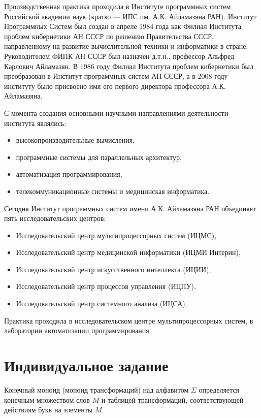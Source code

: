 \documentclass[14pt, russian]{scrartcl}
\begin{document}
\bigskip

Производственная практика проходила в Институте программных систем
Российской академии наук (кратко --- ИПС им. А.К. Айламазяна РАН). Институт Программных Систем был создан в апреле 1984 года как Филиал Института проблем кибернетики АН СССР по решению Правительства СССР, направленному на развитие вычислительной техники и информатики в стране. Руководителем ФИПК АН СССР был назначен д.т.н., профессор Альфред Карлович Айламазян. В 1986 году Филиал Института проблем кибернетики был преобразован в Институт программных систем АН СССР, а в 2008 году институту было присвоено имя его первого директора профессора А.К. Айламазяна.

С момента создания основными научными направлениями
деятельности института являлись:
\begin{itemize}
\item высокопроизводительные вычисления,
\item программные системы для параллельных архитектур,
\item автоматизация программирования,
\item телекоммуникационные системы и медицинская информатика.
\end{itemize}

Сегодня Институт программных систем имени А.К. Айламазяна РАН объединяет пять исследовательских центров:
\begin{itemize}
\item Исследовательский центр мультипроцессорных систем (ИЦМС),
\item Исследовательский центр медицинской информатики (ИЦМИ Интерин),
\item Исследовательский центр искусственного интеллекта (ИЦИИ),
\item Исследовательский центр процессов управления (ИЦПУ),
\item Исследовательский центр системного анализа (ИЦСА).
\end{itemize}

Практика проходила в исследовательском центре мультипроцессорных систем, в лаборатории автоматизации программирования.

\newpage
\section{Индивидуальное задание}

Конечный моноид (моноид трансформаций) над алфавитом $\Sigma$ определяется
конечным множеством слов $M$ и таблицей трансформаций, соответствующей действиям
букв на элементы $M$.
\end{document}
